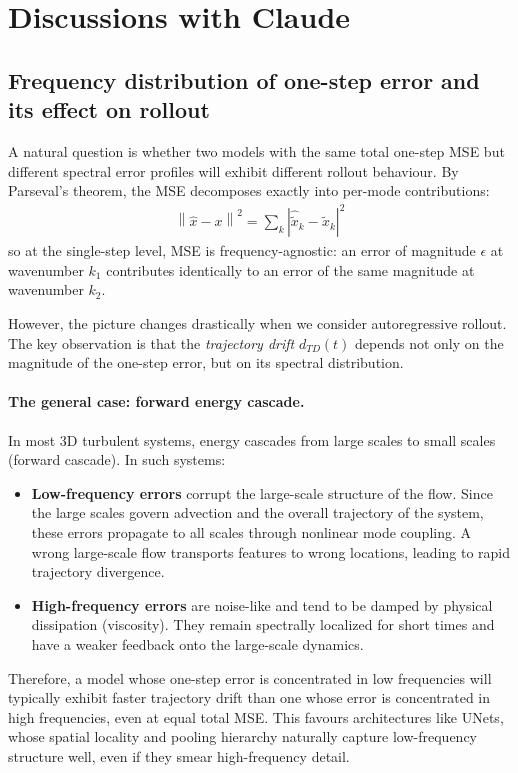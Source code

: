 \documentclass{article}
\newcommand{\norm}[1]{\left\lVert#1\right\rVert}
\begin{document}
\section{Discussions with Claude}

\subsection{Frequency distribution of one-step error and its effect on rollout}

A natural question is whether two models with the same total one-step MSE but different spectral error profiles will exhibit different rollout behaviour. By Parseval's theorem, the MSE decomposes exactly into per-mode contributions:
\begin{align}
    \norm{\hat{x} - x}^2 = \sum_k |\hat{\tilde{x}}_k - \tilde{x}_k|^2
\end{align}
so at the single-step level, MSE is frequency-agnostic: an error of magnitude $\epsilon$ at wavenumber $k_1$ contributes identically to an error of the same magnitude at wavenumber $k_2$.

However, the picture changes drastically when we consider autoregressive rollout. The key observation is that the \textit{trajectory drift} $d_{TD}(t)$ depends not only on the magnitude of the one-step error, but on its spectral distribution.

\paragraph{The general case: forward energy cascade.} In most 3D turbulent systems, energy cascades from large scales to small scales (forward cascade). In such systems:
\begin{itemize}
    \item \textbf{Low-frequency errors} corrupt the large-scale structure of the flow. Since the large scales govern advection and the overall trajectory of the system, these errors propagate to all scales through nonlinear mode coupling. A wrong large-scale flow transports features to wrong locations, leading to rapid trajectory divergence.
    \item \textbf{High-frequency errors} are noise-like and tend to be damped by physical dissipation (viscosity). They remain spectrally localized for short times and have a weaker feedback onto the large-scale dynamics.
\end{itemize}

Therefore, a model whose one-step error is concentrated in low frequencies will typically exhibit faster trajectory drift than one whose error is concentrated in high frequencies, even at equal total MSE. This favours architectures like UNets, whose spatial locality and pooling hierarchy naturally capture low-frequency structure well, even if they smear high-frequency detail.
\end{document}
